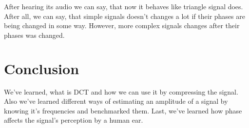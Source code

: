 \documentclass[a4paper]{article}
\begin{document}
        After hearing its audio we can say, that now it behaves like triangle signal does.
        After all, we can say, that simple signals doesn't changes a lot if their phases are being changed in some way.
        However, more complex signals changes after their phases was changed.
            
    \newpage
        \section{Conclusion}
            We've learned, what is DCT and how we can use it by compressing the signal. Also we've learned different ways of estimating an amplitude of a signal by knowing it's frequencies and benchmarked them. Last, we've learned how phase affects the signal's perception by a human ear.
     
\end{document}
